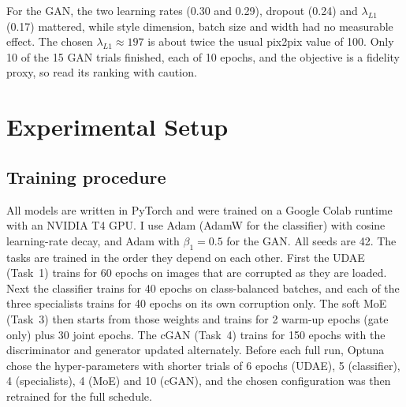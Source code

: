 \documentclass[conference]{IEEEtran}
\let\oldsection\section
\renewcommand{\section}[1]{\oldsection{\textbf{#1}}}
\let\oldsubsection\subsection
\renewcommand{\subsection}[1]{\oldsubsection{\textbf{#1}}}
\begin{document}
For the GAN, the two learning rates (0.30 and 0.29), dropout (0.24) and $\lambda_{L1}$ (0.17) mattered, while style dimension, batch size and width had no measurable effect. The chosen $\lambda_{L1}\approx197$ is about twice the usual pix2pix value of 100. Only 10 of the 15 GAN trials finished, each of 10 epochs, and the objective is a fidelity proxy, so read its ranking with caution.

\section{Experimental Setup}
\subsection{Training procedure}
All models are written in PyTorch and were trained on a Google Colab runtime with an NVIDIA T4 GPU. I use Adam (AdamW for the classifier) with cosine learning-rate decay, and Adam with $\beta_1=0.5$ for the GAN. All seeds are 42. The tasks are trained in the order they depend on each other. First the UDAE (Task~1) trains for 60 epochs on images that are corrupted as they are loaded. Next the classifier trains for 40 epochs on class-balanced batches, and each of the three specialists trains for 40 epochs on its own corruption only. The soft MoE (Task~3) then starts from those weights and trains for 2 warm-up epochs (gate only) plus 30 joint epochs. The cGAN (Task~4) trains for 150 epochs with the discriminator and generator updated alternately. Before each full run, Optuna chose the hyper-parameters with shorter trials of 6 epochs (UDAE), 5 (classifier), 4 (specialists), 4 (MoE) and 10 (cGAN), and the chosen configuration was then retrained for the full schedule.
\end{document}
